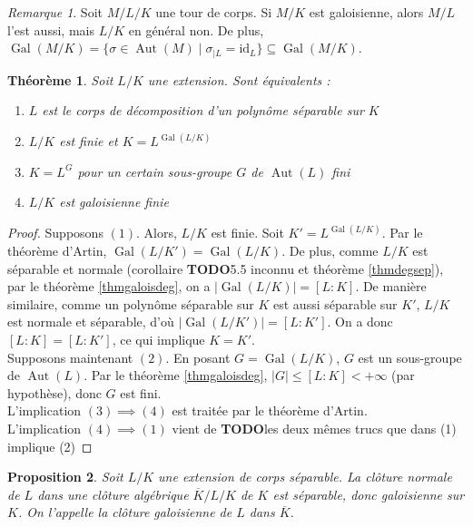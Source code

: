 \documentclass{article}
\newcommand{\id}{\mathrm{id}}
\DeclareMathOperator{\Gal}{Gal}
\DeclareMathOperator{\Aut}{Aut}
\newcommand{\todo}{\textbf{TODO}}
\theoremstyle{plain}
\newtheorem{theorem}{Théorème}[subsection]
\newtheorem{proposition}[theorem]{Proposition}
\theoremstyle{definition}
\theoremstyle{remark}
\newtheorem*{remark}{Remarque}
\begin{document}
\begin{remark}
    Soit $M/L/K$ une tour de corps. Si $M/K$ est galoisienne, alors $M/L$ l'est aussi, mais $L/K$ en général non. De plus, $\Gal(M/K) = \{\sigma \in \Aut(M) \mid \sigma_{\mid L} = \id_L \} \subseteq \Gal(M/K)$.
\end{remark}

\begin{theorem} \label{thmgaloisext}
    Soit $L/K$ une extension. Sont équivalents :
    \begin{enumerate}
        \item $L$ est le corps de décomposition d'un polynôme séparable sur $K$
        \item $L/K$ est finie et $K = L^{\Gal(L/K)}$
        \item $K=L^G$ pour un certain sous-groupe $G$ de $\Aut(L)$ fini
        \item $L/K$ est galoisienne finie
    \end{enumerate}
\end{theorem}

\begin{proof}
    Supposons $(1)$. Alors, $L/K$ est finie. Soit $K' = L^{\Gal(L/K)}$. Par le théorème d'Artin, $\Gal(L/K') = \Gal(L/K)$. De plus, comme $L/K$ est séparable et normale (corollaire \todo 5.5 inconnu et théorème \ref{thmdegsep}), par le théorème \ref{thmgaloisdeg}, on a $|\Gal(L/K)| = [L : K]$. De manière similaire, comme un polynôme séparable sur $K$ est aussi séparable sur $K'$, $L/K$ est normale et séparable, d'où $|\Gal(L/K')| = [L : K']$. On a donc $[L : K] = [L : K']$, ce qui implique $K=K'$. \\
    Supposons maintenant $(2)$. En posant $G = \Gal(L/K)$, $G$ est un sous-groupe de $\Aut(L)$. Par le théorème \ref{thmgaloisdeg}, $|G| \le [L : K] < +\infty$ (par hypothèse), donc $G$ est fini. \\
    L'implication $(3) \implies (4)$ est traitée par le théorème d'Artin. \\
    L'implication $(4) \implies (1)$ vient de \todo les deux mêmes trucs que dans (1) implique (2)
\end{proof}

\begin{proposition}
    Soit $L/K$ une extension de corps séparable. La clôture normale de $L$ dans une clôture algébrique $\overline{K}/L/K$ de $K$ est séparable, donc galoisienne sur $K$. On l'appelle la \emph{clôture galoisienne} de $L$ dans $\overline{K}$.
\end{proposition}
\end{document}
